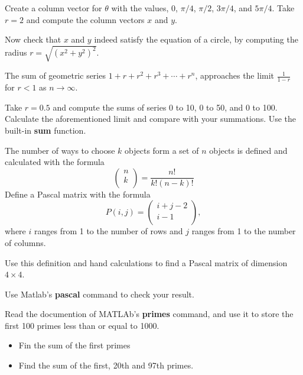 \documentclass[12pt]{TDTP}
\begin{document}
Create a column vector for $\theta$ with the values, $0$, $\pi/4$, $\pi/2$, $3\pi/4$, and $5\pi/4$.
Take $r=2$ and compute the column vectors $x$ and $y$.

Now check that $x$ and $y$ indeed satisfy the equation of a circle, by computing the radius $r=\sqrt{(x^2+y^2)^2}$.

\Exo
The sum of geometric series $1+r+r^2+r^3 + \cdots + r^n$, approaches the limit $\frac{1}{1-r}$ for $r<1$ as $n\rightarrow \infty$.

Take $r=0.5$ and compute the sums of series 0 to 10, 0 to 50, and 0 to 100.
Calculate the aforementioned limit and compare with your summations. Use the built-in \textbf{sum} function.

\Exo
The number of ways to choose $k$ objects form a set of $n$ objects is defined and calculated with the formula
$$
\begin{pmatrix}
n\\k\\
\end{pmatrix}
= \dfrac{n!}{k!(n-k)!}
$$
Define a Pascal matrix with the formula 
$$
P(i,j) = \begin{pmatrix} i+j-2 \\ i-1\\ \end{pmatrix},
$$
where $i$ ranges from 1 to the number of rows and $j$ ranges from 1 to the number of columns.

Use this definition and hand calculations to find a Pascal matrix of dimension $4\times 4$.

Use Matlab's \textbf{pascal} command to check your result. 

\Exo
Read the documention of MATLAb's \textbf{primes} command, and use it to store the first 100 primes less than or equal to 1000.
\begin{itemize}
\item Fin the sum of the first primes
\item Find the sum of the first, 20th and 97th primes.
\end{itemize}
\end{document}
